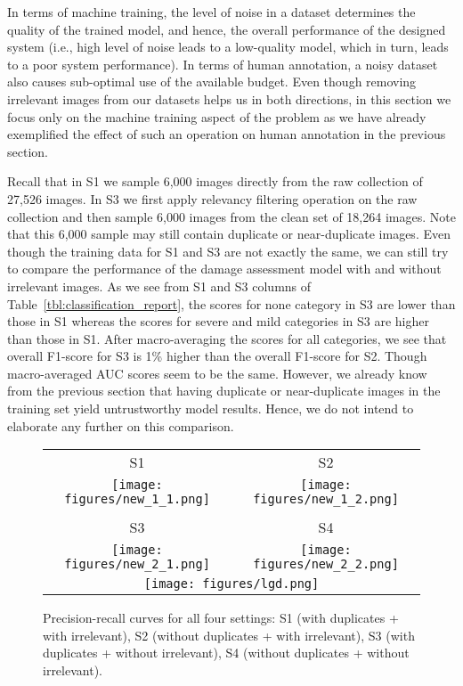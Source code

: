 \documentclass{iscram}
\begin{document}
In terms of machine training, the level of noise in a dataset determines the quality of the trained model, and hence, the overall performance of the designed system (i.e., high level of noise leads to a low-quality model, which in turn, leads to a poor system performance). In terms of human annotation, a noisy dataset also causes sub-optimal use of the available budget. Even though removing irrelevant images from our datasets helps us in both directions, in this section we focus only on the machine training aspect of the problem as we have already exemplified the effect of such an operation on human annotation in the previous section.

Recall that in S1 we sample 6,000 images directly from the raw collection of 27,526 images. In S3 we first apply relevancy filtering operation on the raw collection and then sample 6,000 images from the clean set of 18,264 images. Note that this 6,000 sample may still contain duplicate or near-duplicate images. Even though the training data for S1 and S3 are not exactly the same, we can still try to compare the performance of the damage assessment model with and without irrelevant images. As we see from S1 and S3 columns of Table~\ref{tbl:classification_report}, the scores for none category in S3 are lower than those in S1 whereas the scores for severe and mild categories in S3 are higher than those in S1. After macro-averaging the scores for all categories, we see that overall F1-score for S3 is 1\% higher than the overall F1-score for S2. Though macro-averaged AUC scores seem to be the same. However, we already know from the previous section that having duplicate or near-duplicate images in the training set yield untrustworthy model results. Hence, we do not intend to elaborate any further on this comparison.

\begin{figure}[!htb]
\centering
\begin{tabular}{cc}
S1 & S2 \\
\texttt{[image: figures/new\_1\_1.png]} &
\texttt{[image: figures/new\_1\_2.png]}\\\\
S3 & S4  \\
\texttt{[image: figures/new\_2\_1.png]} &\texttt{[image: figures/new\_2\_2.png]} \\
\multicolumn{2}{c}{\texttt{[image: figures/lgd.png]}}\\
\end{tabular}
\caption{Precision-recall curves for all four settings: S1 (with duplicates + with irrelevant), S2 (without duplicates + with irrelevant), S3 (with duplicates + without irrelevant), S4 (without duplicates + without irrelevant).}
\label{fig:auc}
\end{figure}
\end{document}
